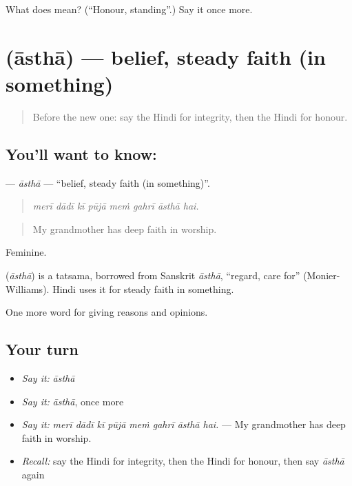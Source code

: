 \begin{tcolorbox}[breakable,colback=teal!4,colframe=teal!35!black,title={Before you move on}]
What does  mean? (\textquotedblleft{}Honour, standing\textquotedblright{}.) Say it once more.
\end{tcolorbox}
\section[\texorpdfstring{\hi{आस्था} (āsthā)}{आस्था (āsthā)}]{ (āsthā) — belief, steady faith (in something)}

\label{lesson:HI-C357-astha}



\begin{quote}
Before the new one: say the Hindi for integrity, then the Hindi for honour.
\end{quote}

\subsection*{You'll want to know: }
\textbf{} — \emph{āsthā} — \textquotedblleft{}belief, steady faith (in something)\textquotedblright{}.

\begin{quote}
       
\end{quote}

\begin{quote}
\emph{merī dādī kī pūjā meṁ gahrī āsthā hai.}
\end{quote}

\begin{quote}
My grandmother has deep faith in worship.
\end{quote}

Feminine.

\begin{cousinweb}
\textbf{} (\emph{āsthā}) is a tatsama, borrowed from Sanskrit \emph{āsthā}, \textquotedblleft{}regard, care for\textquotedblright{} (Monier-Williams). Hindi uses it for steady faith in something.
\end{cousinweb}

\begin{grammarlens}[title={What you've built}]
One more word for giving reasons and opinions.
\end{grammarlens}

\subsection*{Your turn}
\begin{itemize}
\raggedright
  \item \emph{Say it:} \emph{āsthā}
  \item \emph{Say it:} \emph{āsthā}, once more
  \item \emph{Say it:} \emph{merī dādī kī pūjā meṁ gahrī āsthā hai.} — My grandmother has deep faith in worship.
  \item \emph{Recall:} say the Hindi for integrity, then the Hindi for honour, then say \emph{āsthā} again
\end{itemize}

